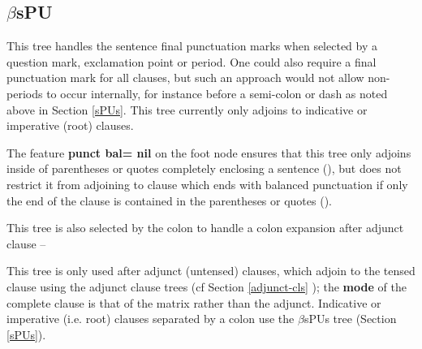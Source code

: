 

\subsection{$\beta$sPU}

This tree handles the sentence final punctuation marks when selected
by a question mark, exclamation point or period. One could also
require a final punctuation mark for all clauses, but such an approach
would not allow non-periods to occur internally, for instance before a
semi-colon or dash as noted above in Section \ref{sPUs}. This tree
currently only adjoins to indicative or imperative (root) clauses.


The feature {\bf punct bal= nil} on the foot node ensures that this
tree only adjoins inside of parentheses or quotes completely enclosing
a sentence (), but does not restrict it from adjoining to clause
which ends with balanced punctuation if only the end of the clause is
contained in the parentheses or quotes ().


This tree is also selected by the colon to handle a colon expansion
after adjunct clause --




This tree is only used after adjunct (untensed) clauses, which adjoin
to the tensed clause using the adjunct clause trees (cf Section
\ref{adjunct-cls} ); the {\bf mode} of the complete clause is that of
the matrix rather than the adjunct. Indicative or imperative
(i.e. root) clauses separated by a colon use the $\beta$sPUs tree
(Section \ref{sPUs}).

